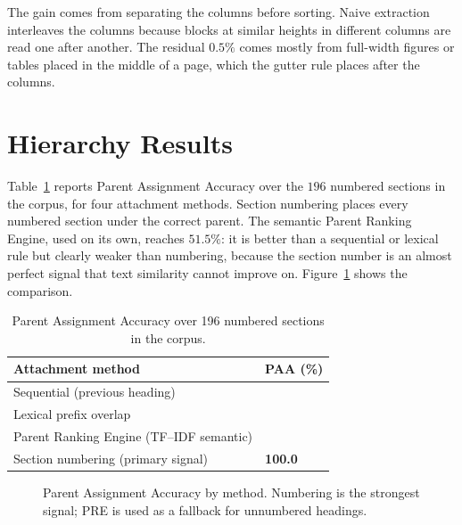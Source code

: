 \documentclass[12pt,a4paper]{report}
\begin{document}
The gain comes from separating the columns before sorting. Naive extraction interleaves
the columns because blocks at similar heights in different columns are read one after
another. The residual $0.5\%$ comes mostly from full-width figures or tables placed in
the middle of a page, which the gutter rule places after the columns.

\section{Hierarchy Results}
Table~\ref{tab:paa} reports Parent Assignment Accuracy over the $196$ numbered sections
in the corpus, for four attachment methods. Section numbering places every numbered
section under the correct parent. The semantic Parent Ranking Engine, used on its own,
reaches $51.5\%$: it is better than a sequential or lexical rule but clearly weaker than
numbering, because the section number is an almost perfect signal that text similarity
cannot improve on. Figure~\ref{fig:paachart} shows the comparison.

\begin{table}[!htbp]
\centering
\caption{Parent Assignment Accuracy over 196 numbered sections in the corpus.}
\label{tab:paa}
\renewcommand{\arraystretch}{1.25}
{\small
\begin{tabularx}{\textwidth}{@{} X >{\centering\arraybackslash}p{3.0cm} @{}}
\toprule
Attachment method & PAA (\%) \\ \midrule
Sequential (previous heading) & 17.9 \\
Lexical prefix overlap & 34.7 \\
Parent Ranking Engine (TF--IDF semantic) & 51.5 \\
Section numbering (primary signal) & \textbf{100.0} \\ \bottomrule
\end{tabularx}}
\end{table}

\begin{figure}[!htbp]
\centering
{}
\caption{Parent Assignment Accuracy by method. Numbering is the strongest signal; PRE is
used as a fallback for unnumbered headings.}
\label{fig:paachart}
\end{figure}
\end{document}
